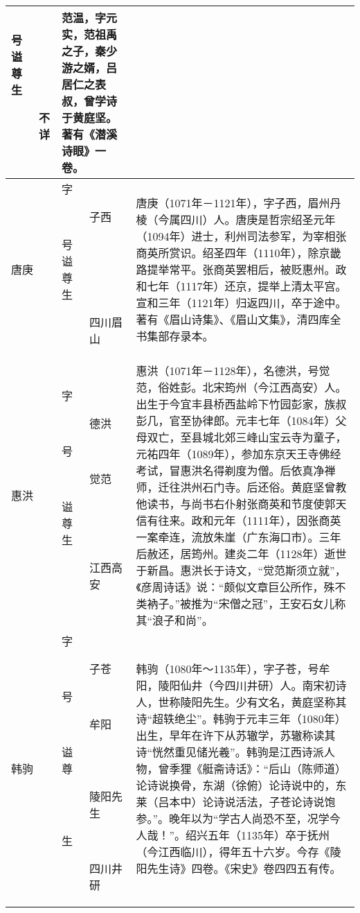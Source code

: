 \begin{longtable}{|>{\centering\namefont\heiti}m{2em}|>{\centering\tiny}m{3.0em}|>{\xzfont\kaiti}m{7.3em}|}
\begin{description}
  \item[号] 
  \item[谥] 
  \item[尊] 
  \item[生] 不详
  \end{description} & 范温，字元实，范祖禹之子，秦少游之婿，吕居仁之表叔，曾学诗于黄庭坚。著有《潜溪诗眼》一卷。 \tabularnewline\hline
  唐庚 & \begin{description}
  \item[字] 子西
  \item[号] 
  \item[谥] 
  \item[尊] 
  \item[生] 四川眉山
  \end{description} & 唐庚（1071年－1121年），字子西，眉州丹棱（今属四川）人。唐庚是哲宗绍圣元年（1094年）进士，利州司法参军，为宰相张商英所赏识。绍圣四年（1110年），除京畿路提举常平。张商英罢相后，被贬惠州。政和七年（1117年）还京，提举上清太平宫。宣和三年（1121年）归返四川，卒于途中。著有《眉山诗集》、《眉山文集》，清四库全书集部存录本。 \tabularnewline\hline
  惠洪 & \begin{description}
  \item[字] 德洪
  \item[号] 觉范
  \item[谥] 
  \item[尊] 
  \item[生] 江西高安
  \end{description} & 惠洪（1071年－1128年），名德洪，号觉范，俗姓彭。北宋筠州（今江西高安）人。出生于今宜丰县桥西盐岭下竹园彭家，族叔彭几，官至协律郎。元丰七年（1084年）父母双亡，至县城北郊三峰山宝云寺为童子，元祐四年（1089年），参加东京天王寺佛经考试，冒惠洪名得剃度为僧。后依真净禅师，迁往洪州石门寺。后还俗。黄庭坚曾教他读书，与尚书右仆射张商英和节度使郭天信有往来。政和元年（1111年），因张商英一案牵连，流放朱崖（广东海口市）。三年后赦还，居筠州。建炎二年（1128年）逝世于新昌。惠洪长于诗文，“觉范斯须立就”，《彦周诗话》说：“颇似文章巨公所作，殊不类衲子。”被推为“宋僧之冠”，王安石女儿称其“浪子和尚”。 \tabularnewline\hline
  韩驹 & \begin{description}
  \item[字] 子苍
  \item[号] 牟阳
  \item[谥] 
  \item[尊] 陵阳先生
  \item[生] 四川井研
  \end{description} & 韩驹（1080年～1135年），字子苍，号牟阳，陵阳仙井（今四川井研）人。南宋初诗人，世称陵阳先生。少有文名，黄庭坚称其诗“超轶绝尘”。韩驹于元丰三年（1080年）出生，早年在许下从苏辙学，苏辙称读其诗“恍然重见储光羲”。韩驹是江西诗派人物，曾季狸《艇斋诗话》：“后山（陈师道）论诗说换骨，东湖（徐俯）论诗说中的，东莱（吕本中）论诗说活法，子苍论诗说饱参。”。晚年以为“学古人尚恐不至，况学今人哉！”。绍兴五年（1135年）卒于抚州（今江西临川），得年五十六岁。今存《陵阳先生诗》四卷。《宋史》卷四四五有传。 \tabularnewline\hline

\end{longtable}
